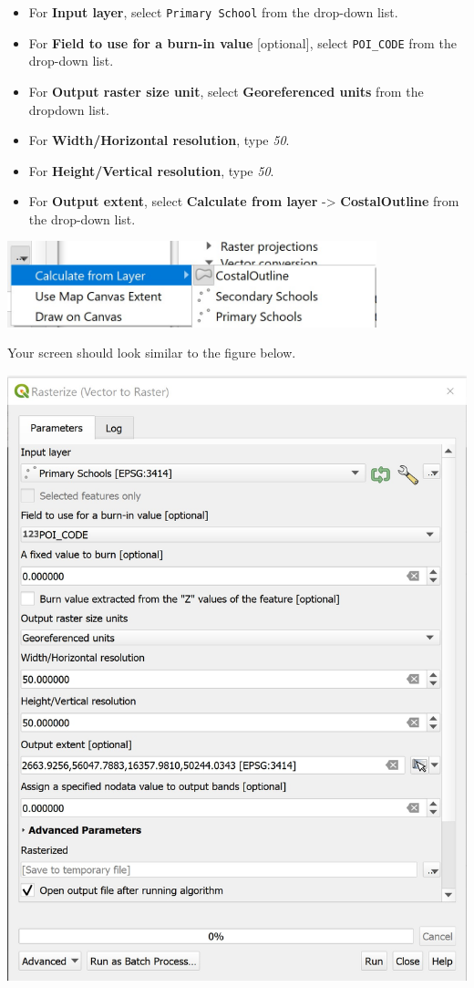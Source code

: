 \documentclass[
  letterpaper,
  DIV=11,
  numbers=noendperiod]{scrreprt}
\providecommand{\tightlist}{%
  \setlength{\itemsep}{0pt}\setlength{\parskip}{0pt}}\usepackage{longtable,booktabs,array}
\begin{document}
\begin{itemize}
\tightlist
\item
  For \textbf{Input layer}, select \texttt{Primary\ School} from the
  drop-down list.
\item
  For \textbf{Field to use for a burn-in value} {[}optional{]}, select
  \texttt{POI\_CODE} from the drop-down list.
\item
  For \textbf{Output raster size unit}, select \textbf{Georeferenced
  units} from the dropdown list.
\item
  For \textbf{Width/Horizontal resolution}, type \emph{50}.
\item
  For \textbf{Height/Vertical resolution}, type \emph{50}.
\item
  For \textbf{Output extent}, select \textbf{Calculate from layer}
  -\textgreater{} \textbf{CostalOutline} from the drop-down list.
\end{itemize}

\includegraphics[width=4.21875in,height=\textheight]{./img06/image9.jpg}

Your screen should look similar to the figure below.

\includegraphics{./img06/image10.jpg}
\end{document}
